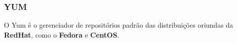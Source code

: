 \subsubsection{YUM} %
\label{ssub:yum}

O Yum é o gerenciador de repositórios padrão  das distribuições oriundas da \textbf{RedHat}, como o \textbf{Fedora} e \textbf{CentOS}.

